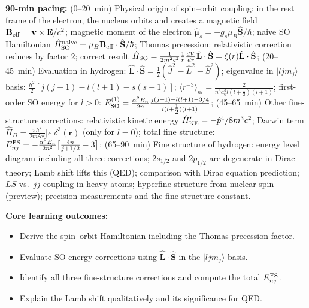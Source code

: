 \documentclass[11pt,a4paper]{article}
\begin{document}
\begin{tcolorbox}[modulebox, title={Module~I.4 / L08: Spin--Orbit Coupling and Fine Structure of Hydrogen}]
\textbf{90-min pacing:} (0--20~min) Physical origin of spin--orbit coupling:
in the rest frame of the electron, the nucleus orbits and creates a magnetic field
$\mathbf{B}_{\rm eff}=\mathbf{v}\times\mathbf{E}/c^2$;
magnetic moment of the electron $\hat{\boldsymbol\mu}_s=-g_s\mu_B\hat{\mathbf{S}}/\hbar$;
naive SO Hamiltonian $\hat{H}_{\rm SO}^{\rm naive}=\mu_B\mathbf{B}_{\rm eff}\cdot\hat{\mathbf{S}}/\hbar$;
Thomas precession: relativistic correction reduces by factor 2;
correct result $\hat{H}_{\rm SO}=\tfrac{1}{2m^2c^2}\tfrac{1}{r}\tfrac{dV}{dr}\hat{\mathbf{L}}\cdot\hat{\mathbf{S}}=\xi(r)\hat{\mathbf{L}}\cdot\hat{\mathbf{S}}$;
(20--45~min) Evaluation in hydrogen: $\hat{\mathbf{L}}\cdot\hat{\mathbf{S}}=\tfrac{1}{2}(\hat{J}^2-\hat{L}^2-\hat{S}^2)$;
eigenvalue in $|ljm_j\rangle$ basis: $\tfrac{\hbar^2}{2}[j(j+1)-l(l+1)-s(s+1)]$;
$\langle r^{-3}\rangle_{nl}=\tfrac{2}{n^3 a_0^3 l(l+\tfrac{1}{2})(l+1)}$;
first-order SO energy for $l>0$: $E_{\rm SO}^{(1)}=\tfrac{\alpha^2 E_n}{2n}\tfrac{j(j+1)-l(l+1)-3/4}{l(l+\tfrac{1}{2})(l+1)}$;
(45--65~min) Other fine-structure corrections: relativistic kinetic energy $\hat{H}_{\rm KE}'=-\hat{p}^4/8m^3c^2$;
Darwin term $\hat{H}_D=\tfrac{\pi\hbar^2}{2m^2c^2}|e|\delta^3(\mathbf{r})$ (only for $l=0$);
total fine structure: $E_{nj}^{\rm FS}=-\tfrac{\alpha^2 E_n}{2n^2}\bigl[\tfrac{4n}{j+1/2}-3\bigr]$;
(65--90~min) Fine structure of hydrogen: energy level diagram including all three corrections;
$2s_{1/2}$ and $2p_{1/2}$ are degenerate in Dirac theory; Lamb shift lifts this (QED);
comparison with Dirac equation prediction; $LS$ vs.\ $jj$ coupling in heavy atoms;
hyperfine structure from nuclear spin (preview); precision measurements and the fine structure constant.

\medskip\textbf{Core learning outcomes:}
\begin{itemize}[leftmargin=1.4em,topsep=2pt,itemsep=1pt]
  \item Derive the spin--orbit Hamiltonian including the Thomas precession factor.
  \item Evaluate SO energy corrections using $\hat{\mathbf{L}}\cdot\hat{\mathbf{S}}$ in the $|ljm_j\rangle$ basis.
  \item Identify all three fine-structure corrections and compute the total $E_{nj}^{\rm FS}$.
  \item Explain the Lamb shift qualitatively and its significance for QED.
\end{itemize}


\end{tcolorbox}
\end{document}
